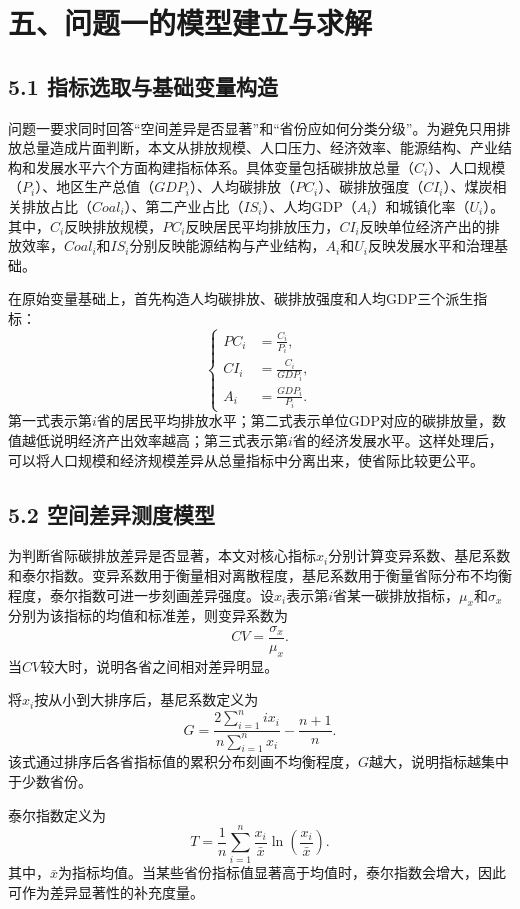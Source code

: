\documentclass[UTF8,zihao=-4,fontset=windows]{ctexart}
\begin{document}
\section*{五、问题一的模型建立与求解}

\subsection*{5.1 指标选取与基础变量构造}

问题一要求同时回答“空间差异是否显著”和“省份应如何分类分级”。为避免只用排放总量造成片面判断，本文从排放规模、人口压力、经济效率、能源结构、产业结构和发展水平六个方面构建指标体系。具体变量包括碳排放总量（$C_i$）、人口规模（$P_i$）、地区生产总值（$GDP_i$）、人均碳排放（$PC_i$）、碳排放强度（$CI_i$）、煤炭相关排放占比（$Coal_i$）、第二产业占比（$IS_i$）、人均GDP（$A_i$）和城镇化率（$U_i$）。其中，$C_i$反映排放规模，$PC_i$反映居民平均排放压力，$CI_i$反映单位经济产出的排放效率，$Coal_i$和$IS_i$分别反映能源结构与产业结构，$A_i$和$U_i$反映发展水平和治理基础。

在原始变量基础上，首先构造人均碳排放、碳排放强度和人均GDP三个派生指标：
\[
\left\{
\begin{aligned}
PC_i&=\frac{C_i}{P_i},\\
CI_i&=\frac{C_i}{GDP_i},\\
A_i&=\frac{GDP_i}{P_i}.
\end{aligned}
\right.
\]
第一式表示第$i$省的居民平均排放水平；第二式表示单位GDP对应的碳排放量，数值越低说明经济产出效率越高；第三式表示第$i$省的经济发展水平。这样处理后，可以将人口规模和经济规模差异从总量指标中分离出来，使省际比较更公平。

\subsection*{5.2 空间差异测度模型}

为判断省际碳排放差异是否显著，本文对核心指标$x_i$分别计算变异系数、基尼系数和泰尔指数。变异系数用于衡量相对离散程度，基尼系数用于衡量省际分布不均衡程度，泰尔指数可进一步刻画差异强度。设$x_i$表示第$i$省某一碳排放指标，$\mu_x$和$\sigma_x$分别为该指标的均值和标准差，则变异系数为
\[
CV=\frac{\sigma_x}{\mu_x}.
\]
当$CV$较大时，说明各省之间相对差异明显。

将$x_i$按从小到大排序后，基尼系数定义为
\[
G=\frac{2\sum_{i=1}^{n}ix_i}{n\sum_{i=1}^{n}x_i}-\frac{n+1}{n}.
\]
该式通过排序后各省指标值的累积分布刻画不均衡程度，$G$越大，说明指标越集中于少数省份。

泰尔指数定义为
\[
T=\frac{1}{n}\sum_{i=1}^{n}\frac{x_i}{\bar{x}}\ln\left(\frac{x_i}{\bar{x}}\right).
\]
其中，$\bar{x}$为指标均值。当某些省份指标值显著高于均值时，泰尔指数会增大，因此可作为差异显著性的补充度量。
\end{document}
